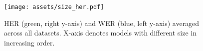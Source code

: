 \begin{figure}[!hbt]
    \centering
    \texttt{[image: assets/size\_her.pdf]}
    \caption{HER (green, right y-axis) and WER (blue, left y-axis) averaged across all datasets. X-axis denotes models with different size in increasing order.}
    \label{fig:werd_herd_whisper}
\end{figure}
